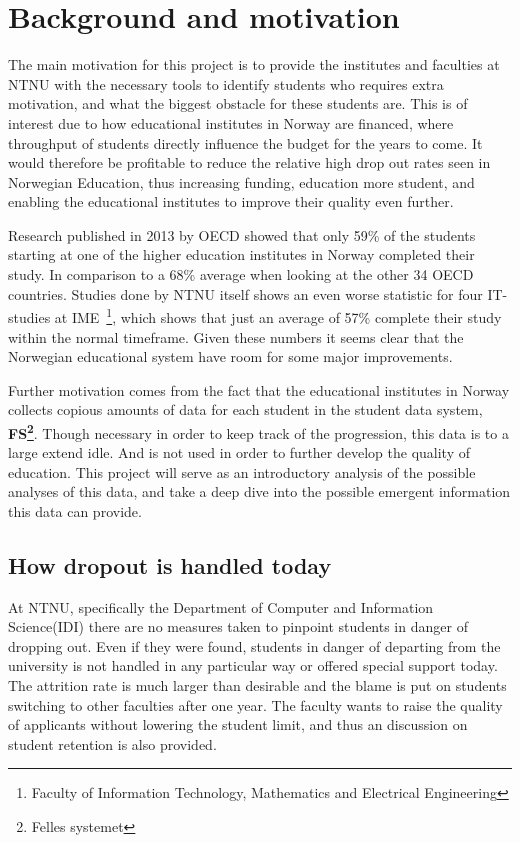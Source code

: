 \section{Background and motivation}
	The main motivation for this project is to provide the institutes and faculties at NTNU 
	with the necessary tools to identify students who requires extra motivation, and what the biggest obstacle for these students are.
	This is of interest due to how educational institutes in Norway are financed, 
	where throughput of students directly influence the budget for the years to come\cite{finansiering}. 
	It would therefore be profitable to reduce the relative high drop out rates seen in Norwegian Education, 
	thus increasing funding, education more student, and enabling the educational institutes to improve their quality even further.
	
	\bigskip\noindent
	Research published in 2013 by OECD showed that only 59\% of the students
	starting at one of the higher education institutes in Norway completed their study.
	In comparison to a 68\% average when looking at the other 34 OECD countries\cite{OECD2013}.
	Studies done by NTNU itself shows an even worse statistic for four IT-studies at IME~\footnote{Faculty of Information Technology, Mathematics and Electrical Engineering},	which shows that just an average of 57\%\cite{ntnu:dropout} complete their study within the normal timeframe.
	Given these numbers it seems clear that the Norwegian educational system have room for some major improvements. 

	\bigskip\noindent
	Further motivation comes from the fact that the educational institutes in Norway collects
	copious amounts of data for each student in the student data system, \textbf{FS\footnote{Felles systemet}}. 
	Though necessary in order to keep track of the progression, 
	this data is to a large extend idle. And is not used in order to further develop the quality of education. 
	This project will serve as an introductory analysis of the possible analyses of this data, 
	and take a deep dive into the possible emergent information this data can provide. 
	
\subsection{How dropout is handled today}
At NTNU, specifically the Department of Computer and Information Science(IDI) there are no measures taken to pinpoint students in danger of dropping out.
Even if they were found, students in danger of departing from the university is not handled in any particular way or offered special support today.
The attrition rate is much larger than desirable and the blame is put on students switching to other faculties after one year.
The faculty wants to raise the quality of applicants without lowering the student limit, and thus an discussion on student retention is also provided. 
